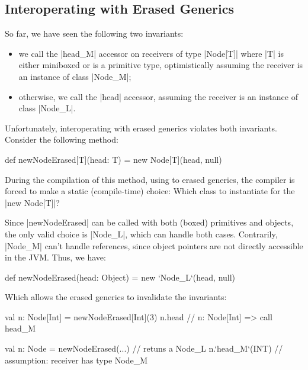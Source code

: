\subsection{Interoperating with Erased Generics}


So far, we have seen the following two invariants:
\begin{itemize}
 \item we call the |head_M| accessor on receivers of type |Node[T]| where |T| is either miniboxed or is a primitive type, optimistically assuming the receiver is an instance of class |Node_M|;
 \item otherwise, we call the |head| accessor, assuming the receiver is an instance of class |Node_L|.
\end{itemize}

Unfortunately, interoperating with erased generics violates both invariants. Consider the following method:

\begin{lstlisting-nobreak}
 def newNodeErased[T](head: T) =
   new Node[T](head, null)
\end{lstlisting-nobreak}

During the compilation of this method, using to erased generics, the compiler is forced to make a static (compile-time) choice: Which class to instantiate for the |new Node[T]|?

Since |newNodeErased| can be called with both (boxed) primitives and objects, the only valid choice is |Node_L|, which can handle both cases. Contrarily, |Node_M| can't handle references, since object pointers are not directly accessible in the JVM. Thus, we have: %

\begin{lstlisting-nobreak}
 def newNodeErased(head: Object) =
   new `Node_L`(head, null)
\end{lstlisting-nobreak}

Which allows the erased generics to invalidate the invariants:

\begin{lstlisting-nobreak}
 val n: Node[Int] = newNodeErased[Int](3)
 n.head // n: Node[Int] => call head_M
\end{lstlisting-nobreak}


\begin{lstlisting-nobreak}
 val n: Node = newNodeErased(...)               // retuns a Node_L
 n.`head_M`(INT)  // assumption: receiver has type Node_M
\end{lstlisting-nobreak}

